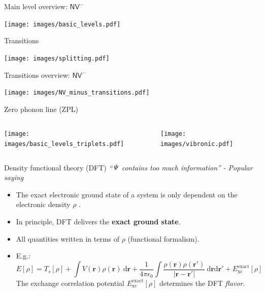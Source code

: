 \documentclass[handout]{beamer}
\begin{document}
\begin{frame}{Main level overview: $ \mathsf{NV}^{-} $ }
  \begin{center}
    \texttt{[image: images/basic\_levels.pdf]}
  \end{center}
\end{frame}

\begin{frame}{Transitions}
  \begin{center}
    \texttt{[image: images/splitting.pdf]}
  \end{center}
\end{frame}

\begin{frame}{Transitions overview: $ \mathsf{NV}^{-} $ }
  \begin{center}
    \texttt{[image: images/NV\_minus\_transitions.pdf]}
  \end{center}
\end{frame}


\begin{frame}{Zero phonon line (ZPL)}
  \begin{columns}
    \begin{column}{0.5\textwidth}
    \texttt{[image: images/basic\_levels\_triplets.pdf]}
    \end{column}
    \begin{column}{0.5\textwidth}
    \texttt{[image: images/vibronic.pdf]}
    \end{column}
  \end{columns}
\end{frame}

\begin{frame}{Density functional theory (DFT)}
  \textit{``$ \it \Psi  $  contains too much information''}
  \hfill \textit{- Popular saying}
  \begin{itemize}
    \item The exact electronic ground state of a system is only dependent on
      the electronic density $ \rho $ .
    \item In principle, DFT delivers the \textbf{exact ground state}.
    \item All quantities written in terms of $ \rho $ (functional formalism).
    \item E.g.:
      \[
        E[ \rho ] =
        T_{s} [ \rho  ]
        +
        \int  V ( \mathbf{r} ) \rho ( \mathbf{r} ) \ \mathrm{d} \mathbf{r}
        +
        \frac{1}{4\pi \epsilon _{0}}
        \int
        \frac{\rho ( \mathbf{r} ) \rho ( \mathbf{r}' )}{| \mathbf{r} - \mathbf{r}'|}
        \ \mathrm{d} \mathbf{r}\mathrm{d} \mathbf{r}'
        +
        E^{ \mathrm{exact}}_{ \mathrm{xc}} [ \rho ]
      \]
      The exchange correlation potential
      $ E^{ \mathrm{exact}}_{ \mathrm{xc}} [ \rho ] $
      determines the DFT \textit{flavor}.
  \end{itemize}
\end{frame}
\end{document}
